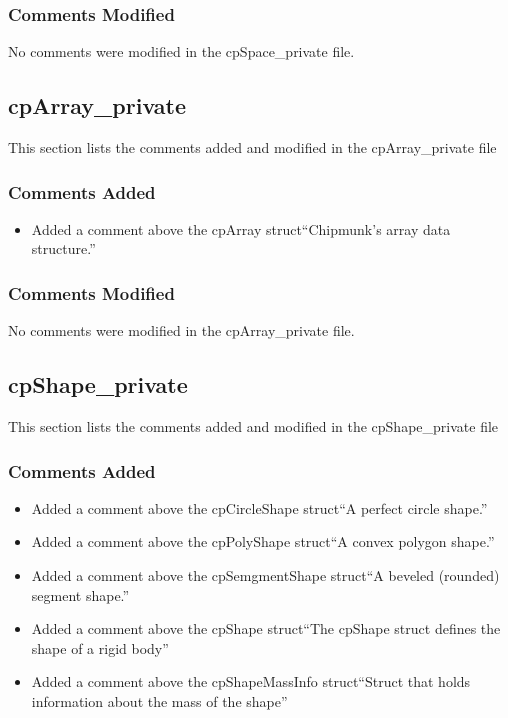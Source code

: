 \documentclass[12pt]{article}
\begin{document}
\subsubsection{Comments Modified}
No comments were modified in the cpSpace\_private file.



\subsection{cpArray\_private} 
This section lists the comments added and modified  in the cpArray\_private file

\subsubsection{Comments Added}
\begin{itemize}
\item Added a comment above the cpArray struct``Chipmunk's array data structure.''
\end{itemize}

\subsubsection{Comments Modified}
No comments were modified in the cpArray\_private file.



\subsection{cpShape\_private} 
This section lists the comments added and modified  in the cpShape\_private file

\subsubsection{Comments Added}
\begin{itemize}
\item Added a comment above the cpCircleShape  struct``A perfect circle shape.''
\item Added a comment above the cpPolyShape  struct``A convex polygon shape.''
\item Added a comment above the cpSemgmentShape  struct``A beveled (rounded) segment shape.''
\item Added a comment above the cpShape  struct``The cpShape struct defines the shape of a rigid body''
\item Added a comment above the cpShapeMassInfo  struct``Struct that holds information about the mass of the shape''
\end{itemize}
\end{document}

